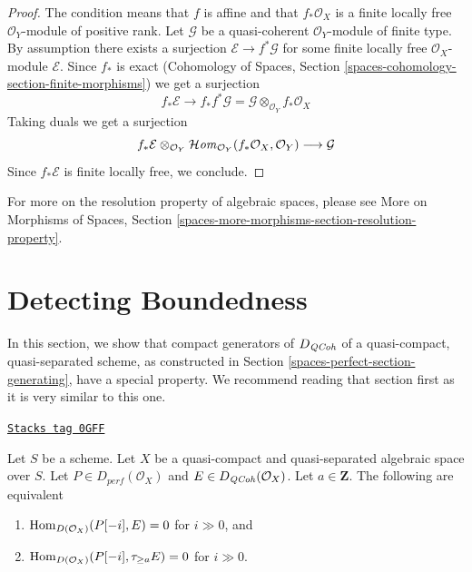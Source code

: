 \begin{proof}
The condition means that $f$ is affine and that $f_*\mathcal{O}_X$
is a finite locally free $\mathcal{O}_Y$-module of positive rank.
Let $\mathcal{G}$ be a quasi-coherent $\mathcal{O}_Y$-module
of finite type. By assumption there exists a surjection
$\mathcal{E} \to f^*\mathcal{G}$ for some finite locally free
$\mathcal{O}_X$-module $\mathcal{E}$. Since $f_*$ is exact
(Cohomology of Spaces, Section \ref{spaces-cohomology-section-finite-morphisms})
we get a surjection
$$
f_*\mathcal{E}
\longrightarrow
f_*f^*\mathcal{G} = \mathcal{G} \otimes_{\mathcal{O}_Y} f_*\mathcal{O}_X
$$
Taking duals we get a surjection
$$
f_*\mathcal{E}
\otimes_{\mathcal{O}_Y}
\mathcal{H}\mathit{om}_{\mathcal{O}_Y}(f_*\mathcal{O}_X, \mathcal{O}_Y)
\longrightarrow
\mathcal{G}
$$
Since $f_*\mathcal{E}$ is finite locally free, we conclude.
\end{proof}

For more on the resolution property of algebraic spaces, please see
More on Morphisms of Spaces, Section
\ref{spaces-more-morphisms-section-resolution-property}.

\section{Detecting Boundedness}
\label{spaces-perfect-section-detecting-boundedness}
In this section, we show that compact generators of $D_{\mathit{QCoh}}$ of a
quasi-compact, quasi-separated scheme, as constructed in
Section \ref{spaces-perfect-section-generating}, have a special property.
We recommend reading that section first as it is very similar to this one.

\begin{lemma}
\label{spaces-perfect-lemma-bounded-truncation}
\href{https://stacks.math.columbia.edu/tag/0GFF}{\texttt{Stacks tag 0GFF}}

Let $S$ be a scheme.
Let $X$ be a quasi-compact and quasi-separated algebraic space over $S$.
Let $P \in D_{perf}(\mathcal{O}_X)$ and $E \in D_{\mathit{QCoh}}(\mathcal{O}_X)$.
Let $a \in \mathbf{Z}$. The following are equivalent
\begin{enumerate}
\item $\operatorname{Hom}_{D(\mathcal{O}_X)}(P[-i], E) = 0$ for $i \gg 0$, and
\item $\operatorname{Hom}_{D(\mathcal{O}_X)}(P[-i], \tau_{\geq a} E) = 0$ for $i \gg 0$.
\end{enumerate}
\end{lemma}

